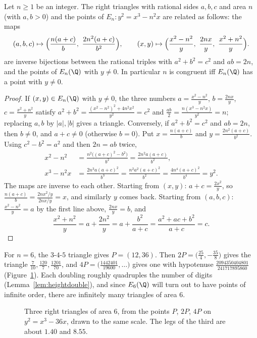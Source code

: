 \begin{proposition}\label{prop:congruent}
Let $n\ge1$ be an integer. The right triangles with rational sides $a,b,c$ and area $n$ (with $a,b>0$) and the points of $E_n:y^2=x^3-n^2x$ are related as follows: the maps
\[
(a,b,c)\mapsto\Bigl(\frac{n(a+c)}b,\ \frac{2n^2(a+c)}{b^2}\Bigr),\qquad(x,y)\mapsto\Bigl(\frac{x^2-n^2}{y},\ \frac{2nx}y,\ \frac{x^2+n^2}{y}\Bigr).
\]
are inverse bijections between the rational triples with $a^2+b^2=c^2$ and $ab=2n$, and the points of $E_n(\Q)$ with $y\ne0$. In particular $n$ is congruent iff
$E_n(\Q)$ has a point with $y\ne0$.
\end{proposition}
\begin{proof}
If $(x,y)\in E_n(\Q)$ with $y\ne0$, the three numbers $a=\frac{x^2-n^2}y$, $b=\frac{2nx}y$, $c=\frac{x^2+n^2}y$ satisfy
$a^2+b^2=\frac{(x^2-n^2)^2+4n^2x^2}{y^2}=c^2$ and $\frac{ab}2=\frac{n(x^3-n^2x)}{y^2}=n$; replacing $a,b$ by $|a|,|b|$ gives a triangle. Conversely, if $a^2+b^2=c^2$ and $ab=2n$, then $b\ne0$, and $a+c\ne0$ (otherwise $b=0$). Put $x=\frac{n(a+c)}b$ and $y=\frac{2n^2(a+c)}{b^2}$. Using
$c^2-b^2=a^2$ and then $2n=ab$ twice,
\[
\begin{aligned}
x^2-n^2&=\frac{n^2\bigl((a+c)^2-b^2\bigr)}{b^2}=\frac{2n^2a(a+c)}{b^2},\\
x^3-n^2x&=\frac{2n^3a(a+c)^2}{b^3}=\frac{n^2a^2(a+c)^2}{b^2}=\frac{4n^4(a+c)^2}{b^4}=y^2.
\end{aligned}
\]
The maps are inverse to each other. Starting from $(x,y)$: $a+c=\frac{2x^2}y$, so $\frac{n(a+c)}b=\frac{2nx^2/y}{2nx/y}=x$, and similarly $y$ comes back. Starting from
$(a,b,c)$: $\frac{x^2-n^2}y=a$ by the first line above, $\frac{2nx}y=b$, and
\[
\frac{x^2+n^2}y=a+\frac{2n^2}y=a+\frac{b^2}{a+c}=\frac{a^2+ac+b^2}{a+c}=c.
\]
\end{proof}

For $n=6$, the $3$-$4$-$5$ triangle gives $P=(12,36)$. Then $2P=\bigl(\frac{25}4,-\frac{35}8\bigr)$ gives the triangle $\frac7{10},\frac{120}7,\frac{1201}{70}$, and
$4P=\bigl(\frac{1442401}{19600},\dots\bigr)$ gives one with hypotenuse $\frac{2094350404801}{241717895860}$ (Figure~\ref{fig:area6}). Each doubling roughly quadruples
the number of digits (Lemma~\ref{lem:heightdouble}), and since $E_6(\Q)$ will turn out to have points of infinite order, there are infinitely many triangles of area
$6$.

\begin{figure}[ht]
\centering{}
\caption{Three right triangles of area $6$, from the points $P$, $2P$, $4P$ on $y^2=x^3-36x$, drawn to the same scale. The legs of the third are
about $1.40$ and $8.55$.}
\label{fig:area6}
\end{figure}

